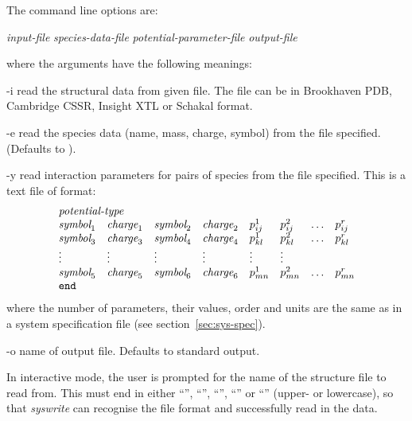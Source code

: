 \documentclass[a4paper,twoside]{report}
\begin{document}
The command line options are:
\begin{center}
\Lit{[-i} \textit{input-file} \Lit{|}
\Lit{[-e} \textit{species-data-file}\Lit{]} 
\Lit{[-y} \textit{potential-parameter-file}\Lit{]} 
\Lit{[-o} \textit{output-file}\Lit{]}
\end{center}

where the arguments have the following meanings:
\begin{Argdescription}
\item[-i] read the structural data from given file. The file can be in
 Brookhaven PDB, Cambridge CSSR, Insight XTL or Schakal format.
\item[-e] read the species data (name, mass, charge, symbol) from the file
specified. (Defaults to ).
\item[-y] read interaction parameters for pairs of species
from the file specified. This is a text file of format:
\begin{displaymath}
\begin{array}{llllllll}
\multicolumn{4}{l}{\textit{potential-type}} \\
\textit{symbol}_1 & \textit{charge}_1 & \textit{symbol}_2 & \textit{charge}_2
 & p^{1}_{ij} & p^{2}_{ij} & \ldots & p^{r}_{ij}  \\
\textit{symbol}_3 & \textit{charge}_3 & \textit{symbol}_4 & \textit{charge}_4
 & p^{1}_{kl} & p^{2}_{kl} & \ldots & p^{r}_{kl}  \\
\vdots & \vdots & \vdots & \vdots & \vdots & \vdots \\
\textit{symbol}_5 & \textit{charge}_5 & \textit{symbol}_6 & \textit{charge}_6
 & p^{1}_{mn} & p^{2}_{mn} & \ldots & p^{r}_{mn}  \\
\Lit{end} \\
\end{array}
\end{displaymath}
where the number of parameters, their values, order and units are the same
as in a system specification file (see section~\ref{sec:sys-spec}).
\item[-o] name of output file. Defaults to standard output.
\end{Argdescription}

In interactive mode, the user is prompted for the name of the structure
file to read from. This must end in either ``'', ``'',
``'', ``'' or ``'' (upper- or lowercase), so that \emph{syswrite} can
recognise the file format and successfully read in the data.
\end{document}
